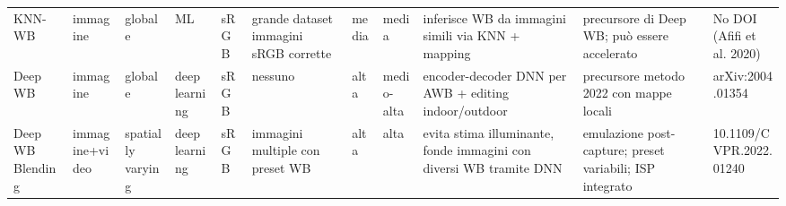 \begin{table}[ht]
{\begin{tabular}{l|llllllllll}
KNN-WB & immagine & globale & ML & sRGB & grande dataset immagini sRGB corrette & media & media & inferisce WB da immagini simili via KNN + mapping & precursore di Deep WB; può essere accelerato & No DOI (Afifi et al. 2020) \\
Deep WB & immagine & globale & deep learning & sRGB & nessuno & alta & medio-alta & encoder-decoder DNN per AWB + editing indoor/outdoor & precursore metodo 2022 con mappe locali & arXiv:2004.01354 \\
Deep WB Blending & immagine+video & spatially varying & deep learning & sRGB & immagini multiple con preset WB & alta & alta & evita stima illuminante, fonde immagini con diversi WB tramite DNN & emulazione post-capture; preset variabili; ISP integrato & 10.1109/CVPR.2022.01240 \\
\bottomrule
\end{tabular}
}
\label{tab:algorithms}
\end{table}
